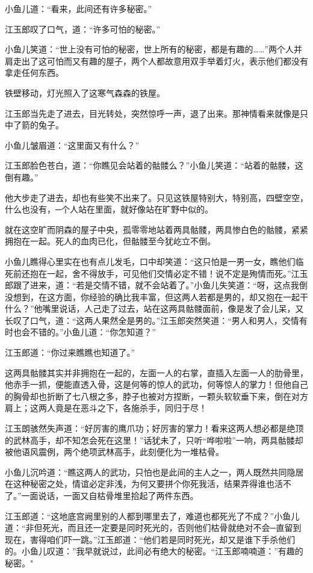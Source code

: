 \documentclass[12pt,oneside]{book}
\begin{document}
小鱼儿道：``看来，此间还有许多秘密。''

江玉郎叹了口气，道：``许多可怕的秘密。''

小鱼儿笑道：``世上没有可怕的秘密，世上所有的秘密，都是有趣的\ldots\ldots{}''两个人并肩走出了这可怕而又有趣的屋子，两个人都故意用双手举着灯火，表示他们都没有拿走任何东西。

铁壁移动，灯光照入了这寒气森森的铁屋。

江玉郎当先走了进去，目光转处，突然惊呼一声，退了出来。那神情看来就像是只中了箭的兔子。

小鱼儿皱眉道：``这里面又有什么？''

江玉郎脸色苍白，道：``你瞧见会站着的骷髅么？''小鱼儿笑道：``站着的骷髅，这倒有趣。''

他大步走了进去，却也有些笑不出来了。只见这铁屋特别大，特别高，四壁空空，什么也没有，─个人站在里面，就好像站在旷野中似的。

就在这空旷而阴森的屋子中央，孤零零地站着两具骷髅，两具惨白色的骷髅，紧紧拥抱在一起。死人的血肉已化，但骷髅至今犹屹立不倒。

小鱼儿瞧得心里实在也有点儿发毛，口中却笑道：``这只怕是一男一女，瞧他们临死前还抱在一起，舍不得放手，可见他们交情必定不错！说不定是殉情而死。''江玉郎跟了进来，道：``若是交情不错，就不会站着了。''小鱼儿失笑道：``呀，这点我倒没想到，在这方面，你经验的确比我丰富，但这两人若都是男的，却又抱在一起干什么？''他嘴里说话，人己走了过去，站在这两具骷髅面前，像是发了会儿呆，又长叹了口气，道：``这两人果然全是男的。''江玉郎突然笑道：``男人和男人，交情有时也会不错的。''小鱼儿道：``你怎知道？''

江玉郎道：``你过来瞧瞧也知道了。''

这两具骷髅其实并非拥抱在一起的，左面一人的右掌，直插入左面一人的肋骨里，他赤手一抓，便能直透入骨，这是何等的惊人的武功，何等惊人的掌力！但他自己的胸骨却也折断了七八根之多，脖子也被对方捏断，一颗头软软垂下来，倒在对方肩上；这两人竟是在恶斗之下，各施杀手，同归于尽！

江玉朗骇然失声道：``好厉害的鹰爪功；好厉害的掌力！看来这两人想必都是绝顶的武林高手，却不知怎会死在这里！''话犹未了，只听``哗啦啦''一响，两具骷髅却被他语风震例，两个绝项武林高手，此刻便化为一堆枯骨。

小鱼儿沉吟道：``瞧这两人的武功，只怕也是此间的主人之一，两人既然共同隐居在这种秘密之处，情谊必定非浅，为何又要拼个你死我活，结果弄得谁也活不了。''一面说话，一面又自枯骨堆里拾起了两件东西。

江玉郎道：``这地底宫阙里别的人都到哪里去了，难道也都死光了不成？''小鱼儿道：``非但死光，而且还一定要是同时死光的，否则他们枯骨就绝对不会─直留到现在，害得咱们吓一跳。''江玉郎道：``他们若是同时死光，却又是谁下手杀他们的。小鱼儿叹道：''我早就说过，此间必有绝大的秘密。``江玉郎喃喃道：''有趣的秘密。"
\end{document}
